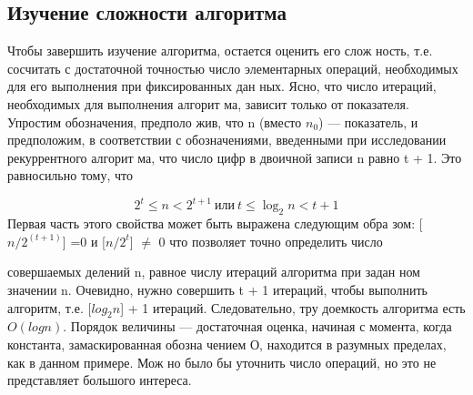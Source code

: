 \subsection{Изучение сложности алгоритма}
Чтобы завершить изучение алгоритма, остается оценить его слож­
ность, т.е. сосчитать с достаточной точностью число элементарных
операций, необходимых для его выполнения при фиксированных дан­
ных. Ясно, что число итераций, необходимых для выполнения алгорит­
ма, зависит только от показателя. Упростим обозначения, предполо­
жив, что n (вместо $n_0$) — показатель, и предположим, в соответствии с
обозначениями, введенными при исследовании рекуррентного алгорит­
ма, что число цифр в двоичной записи n равно t + 1. Это равносильно
тому, что

\begin{equation*}
  2^t \le n < 2^{t+1} \  {\text {или} }  \  t \le \log_2 n < t+1 
\end{equation*}
Первая часть этого свойства может быть выражена следующим обра­
зом: [$n/2^(t+1)$] =0 и [$n/2^t$] $\not=$ 0 что позволяет точно определить число

\newpage
совершаемых делений n, равное числу итераций алгоритма при задан­
ном значении n. Очевидно, нужно совершить t + 1 итераций, чтобы
выполнить алгоритм, т.е. [$log_2 n$] + 1 итераций. Следовательно, тру­
доемкость алгоритма есть $O(log n)$. Порядок величины — достаточная
оценка, начиная с момента, когда константа, замаскированная обозна­
чением О, находится в разумных пределах, как в данном примере. Мож­
но было бы уточнить число операций, но это не представляет большого
интереса.
\newline

